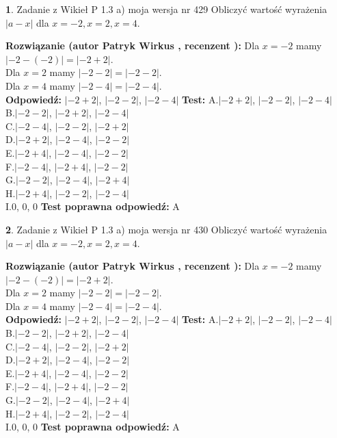 \documentclass[12pt, a4paper]{article}
\theoremstyle{definition} %
\newtheorem{zad}{}
\newcommand{\zadStart}[1]{\begin{zad}#1\newline}
\newcommand{\zadStop}{\end{zad}}
\newcommand{\rozwStart}[2]{\noindent \textbf{Rozwiązanie (autor #1 , recenzent #2): }\newline}
\newcommand{\rozwStop}{\newline}
\newcommand{\odpStart}{\noindent \textbf{Odpowiedź:}\newline}
\newcommand{\odpStop}{\newline}
\newcommand{\testStart}{\noindent \textbf{Test:}\newline}
\newcommand{\testStop}{\newline}
\newcommand{\kluczStart}{\noindent \textbf{Test poprawna odpowiedź:}\newline}
\newcommand{\kluczStop}{\newline}
\begin{document}
\zadStart{Zadanie z Wikieł P 1.3 a) moja wersja nr 429}
Obliczyć wartość wyrażenia $|a - x|$ dla $x=-2,x=2,x=4$.
\zadStop
\rozwStart{Patryk Wirkus}{}
Dla $x = -2$ mamy $|-2 - (-2)| = |-2 + 2|$.\\
Dla $x = 2$ mamy $|-2 - 2| = |-2 - 2|$.\\
Dla $x = 4$ mamy $|-2 - 4| = |-2 - 4|$.\\
\rozwStop
\odpStart
$|-2 + 2|$, $|-2 - 2|$, $|-2 - 4|$
\odpStop
\testStart
A.$|-2 + 2|$, $|-2 - 2|$, $|-2 - 4|$\\
B.$|-2 - 2|$, $|-2 + 2|$, $|-2 - 4|$\\
C.$|-2 - 4|$, $|-2 - 2|$, $|-2 + 2|$\\
D.$|-2 + 2|$, $|-2 - 4|$, $|-2 - 2|$\\
E.$|-2 + 4|$, $|-2 - 4|$, $|-2 - 2|$\\
F.$|-2 - 4|$, $|-2 + 4|$, $|-2 - 2|$\\
G.$|-2 - 2|$, $|-2 - 4|$, $|-2 + 4|$\\
H.$|-2 + 4|$, $|-2 - 2|$, $|-2 - 4|$\\
I.$0$, $0$, $0$
\testStop
\kluczStart
A
\kluczStop



\zadStart{Zadanie z Wikieł P 1.3 a) moja wersja nr 430}
Obliczyć wartość wyrażenia $|a - x|$ dla $x=-2,x=2,x=4$.
\zadStop
\rozwStart{Patryk Wirkus}{}
Dla $x = -2$ mamy $|-2 - (-2)| = |-2 + 2|$.\\
Dla $x = 2$ mamy $|-2 - 2| = |-2 - 2|$.\\
Dla $x = 4$ mamy $|-2 - 4| = |-2 - 4|$.\\
\rozwStop
\odpStart
$|-2 + 2|$, $|-2 - 2|$, $|-2 - 4|$
\odpStop
\testStart
A.$|-2 + 2|$, $|-2 - 2|$, $|-2 - 4|$\\
B.$|-2 - 2|$, $|-2 + 2|$, $|-2 - 4|$\\
C.$|-2 - 4|$, $|-2 - 2|$, $|-2 + 2|$\\
D.$|-2 + 2|$, $|-2 - 4|$, $|-2 - 2|$\\
E.$|-2 + 4|$, $|-2 - 4|$, $|-2 - 2|$\\
F.$|-2 - 4|$, $|-2 + 4|$, $|-2 - 2|$\\
G.$|-2 - 2|$, $|-2 - 4|$, $|-2 + 4|$\\
H.$|-2 + 4|$, $|-2 - 2|$, $|-2 - 4|$\\
I.$0$, $0$, $0$
\testStop
\kluczStart
A
\kluczStop
\end{document}
